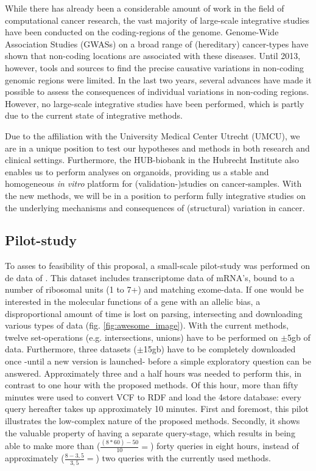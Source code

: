 \documentclass[twoside,fontsize=10pt]{article}
\begin{document}
\noindent
While there has already been a considerable amount of work in the field of computational cancer research, the vast majority of large-scale integrative studies have been conducted on the coding-regions of the genome\cite{ENCODE}. Genome-Wide Association Studies (GWASs) on a broad range of (hereditary) cancer-types have shown that non-coding locations are associated with these diseases. Until 2013, however, tools and sources to find the precise causative variations in non-coding genomic regions were limited. In the last two years, several advances have made it possible to assess the consequences of individual variations in non-coding regions\cite{Ongen2014,Khurana2013}. However, no large-scale integrative studies have been performed, which is partly due to the current state of integrative methods. 

Due to the affiliation with the University Medical Center Utrecht (UMCU), we are in a unique position to test our hypotheses and methods in both research and clinical settings. Furthermore, the HUB-biobank in the Hubrecht Institute also enables us to perform analyses on organoids, providing us a stable and homogeneous \textit{in vitro} platform for (validation-)studies on cancer-samples. With the new methods, we will be in a position to perform fully integrative studies on the underlying mechanisms and consequences of (structural) variation in cancer.

\subsection*{Pilot-study}
To asses to feasibility of this proposal, a small-scale pilot-study was performed on de data of \citet{VanHeesch2014}. This dataset includes transcriptome data of mRNA's, bound to a number of ribosomal units (1 to 7+) and matching exome-data. If one would be interested in the molecular functions of a gene with an allelic bias, a disproportional amount of time is lost on parsing, intersecting and downloading various types of data (fig. \ref{fig:awesome_image}). With the current methods, twelve set-operations (e.g. intersections, unions) have to be performed on $\pm$5gb of data. Furthermore, three datasets ($\pm$15gb) have to be completely downloaded once -until a new version is launched- before a simple exploratory question can be answered. Approximately three and a half hours was needed to perform this, in contrast to one hour with the proposed methods. Of this hour, more than fifty minutes were used to convert VCF to RDF and load the 4store database: every query hereafter takes up approximately 10 minutes. First and foremost, this pilot illustrates the low-complex nature of the proposed methods. Secondly, it shows the valuable property of having a separate query-stage, which results in being able to make more than ($\frac{(8*60)-50}{10}= $) forty queries in eight hours, instead of approximately ($\frac{8-3,5}{3,5}= $) two queries with the currently used methods.
\end{document}
